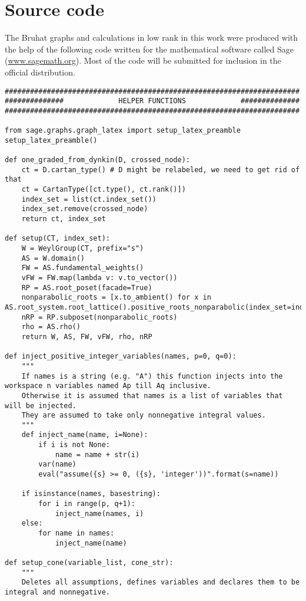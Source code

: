 \chapter{Source code}\label{app:source}
The Bruhat graphs and calculations in low rank in this work were produced with the help of the following code written for the mathematical software called Sage (\url{www.sagemath.org}). Most of the code will be submitted for inclusion in the official distribution.

\begin{verbatim}
######################################################################
##############             HELPER FUNCTIONS             ##############
######################################################################

from sage.graphs.graph_latex import setup_latex_preamble
setup_latex_preamble()

def one_graded_from_dynkin(D, crossed_node):
    ct = D.cartan_type() # D might be relabeled, we need to get rid of that
    ct = CartanType([ct.type(), ct.rank()])
    index_set = list(ct.index_set())
    index_set.remove(crossed_node)
    return ct, index_set

def setup(CT, index_set):
    W = WeylGroup(CT, prefix="s")
    AS = W.domain()
    FW = AS.fundamental_weights()
    vFW = FW.map(lambda v: v.to_vector())
    RP = AS.root_poset(facade=True)
    nonparabolic_roots = [x.to_ambient() for x in AS.root_system.root_lattice().positive_roots_nonparabolic(index_set=index_set)]
    nRP = RP.subposet(nonparabolic_roots)
    rho = AS.rho()
    return W, AS, FW, vFW, rho, nRP

def inject_positive_integer_variables(names, p=0, q=0):
    """
    If names is a string (e.g. "A") this function injects into the workspace n variables named Ap till Aq inclusive.
    Otherwise it is assumed that names is a list of variables that will be injected.
    They are assumed to take only nonnegative integral values.
    """
    def inject_name(name, i=None):
        if i is not None:
            name = name + str(i)
        var(name)
        eval("assume({s} >= 0, ({s}, 'integer'))".format(s=name))

    if isinstance(names, basestring):
        for i in range(p, q+1):
            inject_name(names, i)
    else:
        for name in names:
            inject_name(name)

def setup_cone(variable_list, cone_str):
    """
    Deletes all assumptions, defines variables and declares them to be integral and nonnegative.


\end{verbatim}
